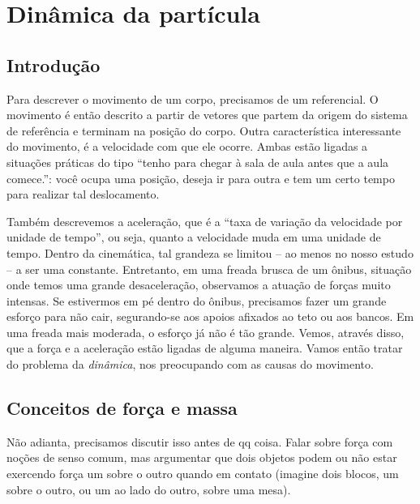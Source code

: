 \chapter{Dinâmica da partícula}
\label{Chap:Dinâmica}


\section{Introdução}
{\it

Para descrever o movimento de um corpo, precisamos de um referencial. O movimento é então descrito a partir de vetores que partem da origem do sistema de referência e terminam na posição do corpo. Outra característica interessante do movimento, é a velocidade com que ele ocorre. Ambas estão ligadas a situações práticas do tipo ``tenho  para chegar à sala de aula antes que a aula comece.'': você ocupa uma posição, deseja ir para outra e tem um certo tempo para realizar tal deslocamento.

Também descrevemos a aceleração, que é a ``taxa de variação da velocidade por unidade de tempo'', ou seja, quanto a velocidade muda em uma unidade de tempo. Dentro da cinemática, tal grandeza se limitou -- ao menos no nosso estudo -- a ser uma constante. Entretanto, em uma freada brusca de um ônibus, situação onde temos uma grande desaceleração, observamos a atuação de forças muito intensas. Se estivermos em pé dentro do ônibus, precisamos fazer um grande esforço para não cair, segurando-se aos apoios afixados ao teto ou aos bancos. Em uma freada mais moderada, o esforço já não é tão grande. Vemos, através disso, que a força e a aceleração estão ligadas de alguma maneira. Vamos então tratar do problema da \emph{dinâmica}, nos preocupando com as causas do movimento.
}


\section{Conceitos de força e massa}

Não adianta, precisamos discutir isso antes de qq coisa. Falar sobre força com noções de senso comum, mas argumentar que dois objetos podem ou não estar exercendo força um sobre o outro quando em contato (imagine dois blocos, um sobre o outro, ou um ao lado do outro, sobre uma mesa). 




